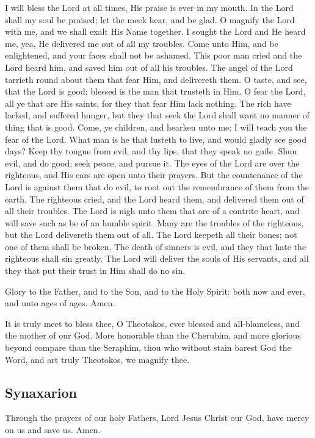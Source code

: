 I will bless the Lord at all times, His praise is ever in my mouth. In the Lord shall my soul be praised; let the meek hear, and be glad. O magnify the Lord with me, and we shall exalt His Name together. I sought the Lord and He heard me, yea, He delivered me out of all my troubles. Come unto Him, and be enlightened, and your faces shall not be ashamed. This poor man cried and the Lord heard him, and saved him out of all his troubles. The angel of the Lord tarrieth round about them that fear Him, and delivereth them. O taste, and see, that the Lord is good; blessed is the man that trusteth in Him. O fear the Lord, all ye that are His saints, for they that fear Him lack nothing. The rich have lacked, and suffered hunger, but they that seek the Lord shall want no manner of thing that is good. Come, ye children, and hearken unto me; I will teach you the fear of the Lord. What man is he that lusteth to live, and would gladly see good days? Keep thy tongue from evil, and thy lips, that they speak no guile. Shun evil, and do good; seek peace, and pursue it. The eyes of the Lord are over the righteous, and His ears are open unto their prayers. But the countenance of the Lord is against them that do evil, to root out the remembrance of them from the earth. The righteous cried, and the Lord heard them, and delivered them out of all their troubles. The Lord is nigh unto them that are of a contrite heart, and will save such as be of an humble spirit. Many are the troubles of the righteous, but the Lord delivereth them out of all. The Lord keepeth all their bones; not one of them shall be broken. The death of sinners is evil, and they that hate the righteous shall sin greatly. The Lord will deliver the souls of His servants, and all they that put their trust in Him shall do no sin.

Glory to the Father, and to the Son, and to the Holy Spirit: both now and ever, and unto ages of ages. Amen.

It is truly meet to bless thee, O Theotokos, ever blessed and all-blameless, and the mother of our God. More honorable than the Cherubim, and more glorious beyond compare than the Seraphim, thou who without stain barest God the Word, and art truly Theotokos, we magnify thee.

\subsection{Synaxarion}


Through the prayers of our holy Fathers, Lord Jesus Christ our God, have mercy on us and save us. Amen.

\cleardoublepage
